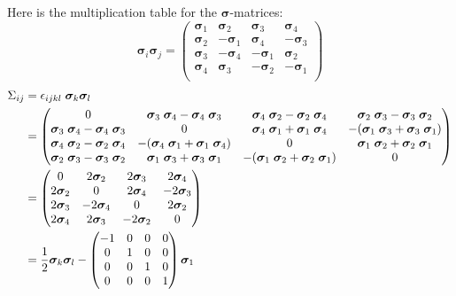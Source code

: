 \documentclass[11pt, oneside]{article}   	%
\begin{document}
Here is the multiplication table for the $\bm{\sigma}$-matrices:
\begin{equation} \bm{\sigma}_i \bm{\sigma}_j =
    \begin{pmatrix}
        \bm{\sigma}_1 &\bm{\sigma}_2 &  \bm{\sigma}_3 &  \bm{\sigma}_4 \\
        \bm{\sigma}_2 &-\bm{\sigma}_1 &  \bm{\sigma}_4 & -\bm{\sigma}_3 \\
        \bm{\sigma}_3 &-\bm{\sigma}_4 & -\bm{\sigma}_1 &  \bm{\sigma}_2 \\
        \bm{\sigma}_4 &\bm{\sigma}_3 & -\bm{\sigma}_2 & -\bm{\sigma}_1 \\
    \end{pmatrix}
\end{equation}
\begin{equation}
    \begin{aligned}
        \Sigma_{ij}
        &= \epsilon_{ijkl} \; \bm{\sigma}_k \bm{\sigma}_l \\
        &=
        \begin{pmatrix}
            0                     &  \bm{\sigma}_{3}\;\bm{\sigma}_{4}-\bm{\sigma}_{4}\;\bm{\sigma}_{3}  &  \bm{\sigma}_{4}\;\bm{\sigma}_{2}-\bm{\sigma}_{2}\;\bm{\sigma}_{4}  &  \bm{\sigma}_{2}\;\bm{\sigma}_{3}-\bm{\sigma}_{3}\;\bm{\sigma}_{2} \\
            \bm{\sigma}_{3}\;\bm{\sigma}_{4}-\bm{\sigma}_{4}\;\bm{\sigma}_{3} &  0                      &  \bm{\sigma}_{4}\;\bm{\sigma}_{1}+\bm{\sigma}_{1}\;\bm{\sigma}_{4}  &-(\bm{\sigma}_{1}\;\bm{\sigma}_{3}+\bm{\sigma}_{3}\;\bm{\sigma}_{1}) \\
            \bm{\sigma}_{4}\;\bm{\sigma}_{2}-\bm{\sigma}_{2}\;\bm{\sigma}_{4} &-(\bm{\sigma}_{4}\;\bm{\sigma}_{1}+\bm{\sigma}_{1}\;\bm{\sigma}_{4}) &  0                      &  \bm{\sigma}_{1}\;\bm{\sigma}_{2}+\bm{\sigma}_{2}\;\bm{\sigma}_{1} \\
            \bm{\sigma}_{2}\;\bm{\sigma}_{3}-\bm{\sigma}_{3}\;\bm{\sigma}_{2} &  \bm{\sigma}_{1}\;\bm{\sigma}_{3}+\bm{\sigma}_{3}\;\bm{\sigma}_{1}  &-(\bm{\sigma}_{1}\;\bm{\sigma}_{2}+\bm{\sigma}_{2}\;\bm{\sigma}_{1}) &  0
        \end{pmatrix} \\
        &=
        \begin{pmatrix}
            0              &  2\bm{\sigma}_2  &  2\bm{\sigma}_3  &  2\bm{\sigma}_4 \\
            2\bm{\sigma}_2 &  0               &  2\bm{\sigma}_4  & -2\bm{\sigma}_3 \\
            2\bm{\sigma}_3 & -2\bm{\sigma}_4  &  0               &  2\bm{\sigma}_2 \\
            2\bm{\sigma}_4 &  2\bm{\sigma}_3  & -2\bm{\sigma}_2  &  0
        \end{pmatrix} \\
        &= \frac{1}{2} \bm{\sigma}_k \bm{\sigma}_l - 
        \begin{pmatrix}
            -1 & 0  & 0  & 0 \\
             0 & 1  & 0  & 0 \\
             0 & 0  & 1  & 0 \\
             0 & 0  & 0  & 1
        \end{pmatrix} \bm{\sigma}_1 \\
    \end{aligned}
\end{equation}
\end{document}
